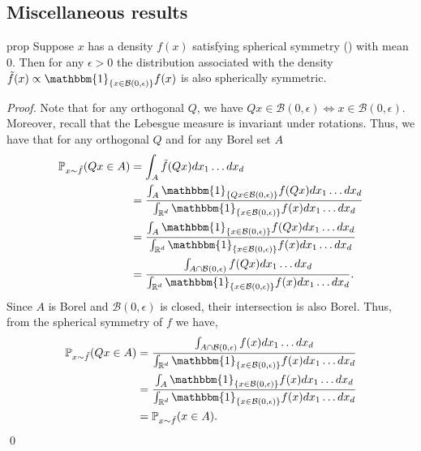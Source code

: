\documentclass[11pt]{article}
\begin{document}
\subsection{Miscellaneous results}


\begin{restatable}{prop}{} \label{prop: conditional spherical symmetry}
    Suppose $x$ has a density $f(x)$ satisfying spherical symmetry () with mean $0$. Then for any $\epsilon > 0$ the distribution associated with the density $\tilde{f}(x) \propto \mathbbm{1}_{\{x \in \mathcal{B}(0, \epsilon)\}}f(x)$ is also spherically symmetric. 
\end{restatable}
\noindent \textit{Proof.} Note that for any orthogonal $Q$, we have $Qx \in \mathcal{B}(0, \epsilon) \iff x \in \mathcal{B}(0, \epsilon)$. Moreover, recall that the Lebesgue measure is invariant under rotations. Thus, we have that for any orthogonal $Q$ and for any Borel set $A$
\begin{align*}
    \mathbb{P}_{x \sim \tilde f}(Qx \in A) &= \int_{A}\tilde{f}(Qx)dx_1\dots dx_d \\
    &= \frac{\int_{A}\mathbbm{1}_{\{Qx \in \mathcal{B}(0,\epsilon)\}} f(Qx)dx_1\dots dx_d}{\int_{\mathbb{R}^d}\mathbbm{1}_{\{x \in \mathcal{B}(0, \epsilon)\}}f(x) dx_1\dots dx_d} \\
    &= \frac{\int_{A}\mathbbm{1}_{\{x \in \mathcal{B}(0,\epsilon)\}} f(Qx)dx_1\dots dx_d}{\int_{\mathbb{R}^d}\mathbbm{1}_{\{x \in \mathcal{B}(0, \epsilon)\}}f(x) dx_1\dots dx_d} \\
    &= \frac{\int_{A\cap \mathcal{B}(0, \epsilon)}f(Qx)dx_1\dots dx_d}{\int_{\mathbb{R}^d}\mathbbm{1}_{\{x \in \mathcal{B}(0, \epsilon)\}}f(x) dx_1\dots dx_d}.
\end{align*}
Since $A$ is Borel and $\mathcal{B}(0, \epsilon)$ is closed, their intersection is also Borel. Thus, from the spherical symmetry of $f$ we have,
\begin{align*}
    \mathbb{P}_{x \sim \tilde f}(Qx \in A) &= \frac{\int_{A\cap \mathcal{B}(0, \epsilon)}f(x)dx_1\dots dx_d}{\int_{\mathbb{R}^d}\mathbbm{1}_{\{x \in \mathcal{B}(0, \epsilon)\}}f(x) dx_1\dots dx_d} \\
    &= \frac{\int_{A}\mathbbm{1}_{\{x \in \mathcal{B}(0, \epsilon)\}}f(x)dx_1\dots dx_d}{\int_{\mathbb{R}^d}\mathbbm{1}_{\{x \in \mathcal{B}(0, \epsilon)\}}f(x) dx_1\dots dx_d} \\
    &= \mathbb{P}_{x \sim \tilde f}(x \in A).
\end{align*}
\qed{}
\end{document}
